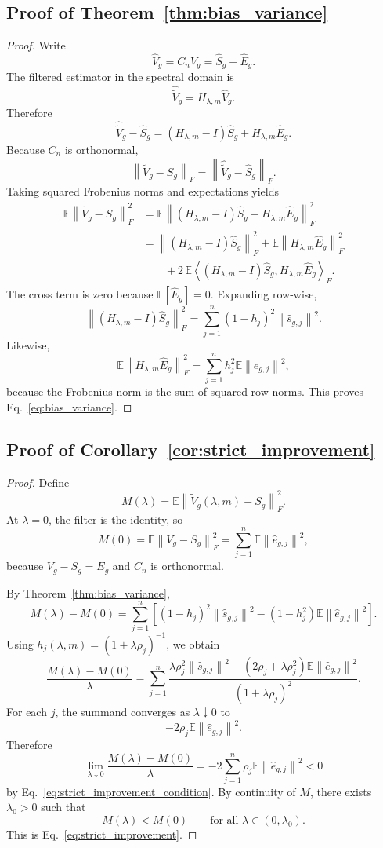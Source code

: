 \documentclass{article}
\newcommand{\EE}{\mathbb{E}}
\newcommand{\norm}[1]{\left\lVert #1 \right\rVert}
\newcommand{\inner}[2]{\left\langle #1, #2 \right\rangle}
\begin{document}
\subsection{Proof of Theorem~\ref{thm:bias_variance}}

\begin{proof}
Write
\[
\widehat V_g = C_n V_g = \widehat S_g + \widehat E_g.
\]
The filtered estimator in the spectral domain is
\[
\widehat{\widetilde V}_g
=
H_{\lambda,m}\widehat V_g.
\]
Therefore
\[
\widehat{\widetilde V}_g - \widehat S_g
=
(H_{\lambda,m}-I)\widehat S_g + H_{\lambda,m}\widehat E_g.
\]
Because \(C_n\) is orthonormal,
\[
\norm{\widetilde V_g - S_g}_F
=
\norm{\widehat{\widetilde V}_g - \widehat S_g}_F.
\]
Taking squared Frobenius norms and expectations yields
\begin{align*}
\EE\norm{\widetilde V_g - S_g}_F^2
&=
\EE\norm{(H_{\lambda,m}-I)\widehat S_g + H_{\lambda,m}\widehat E_g}_F^2 \\
&=
\norm{(H_{\lambda,m}-I)\widehat S_g}_F^2
+
\EE\norm{H_{\lambda,m}\widehat E_g}_F^2 \\
&\qquad
+
2\,\EE\inner{(H_{\lambda,m}-I)\widehat S_g}{H_{\lambda,m}\widehat E_g}_F.
\end{align*}
The cross term is zero because \(\EE[\widehat E_g]=0\). Expanding row-wise,
\[
\norm{(H_{\lambda,m}-I)\widehat S_g}_F^2
=
\sum_{j=1}^{n}
(1-h_j)^2 \norm{\widehat s_{g,j}}^2.
\]
Likewise,
\[
\EE\norm{H_{\lambda,m}\widehat E_g}_F^2
=
\sum_{j=1}^{n} h_j^2 \EE\norm{\widehat e_{g,j}}^2,
\]
because the Frobenius norm is the sum of squared row norms. This proves Eq.~\eqref{eq:bias_variance}.
\end{proof}

\subsection{Proof of Corollary~\ref{cor:strict_improvement}}

\begin{proof}
Define
\[
M(\lambda)
=
\EE \norm{\widetilde V_g(\lambda,m) - S_g}_F^2.
\]
At \(\lambda=0\), the filter is the identity, so
\[
M(0)
=
\EE\norm{V_g - S_g}_F^2
=
\sum_{j=1}^{n}\EE\norm{\widehat e_{g,j}}^2,
\]
because \(V_g-S_g = E_g\) and \(C_n\) is orthonormal.

By Theorem~\ref{thm:bias_variance},
\[
M(\lambda)-M(0)
=
\sum_{j=1}^{n}
\left[
(1-h_j)^2 \norm{\widehat s_{g,j}}^2
-
(1-h_j^2)\EE\norm{\widehat e_{g,j}}^2
\right].
\]
Using \(h_j(\lambda,m)=(1+\lambda \rho_j)^{-1}\), we obtain
\[
\frac{M(\lambda)-M(0)}{\lambda}
=
\sum_{j=1}^{n}
\frac{
\lambda \rho_j^2 \norm{\widehat s_{g,j}}^2
-
(2\rho_j+\lambda \rho_j^2)\EE\norm{\widehat e_{g,j}}^2
}{
(1+\lambda \rho_j)^2
}.
\]
For each \(j\), the summand converges as \(\lambda\downarrow 0\) to
\[
-2\rho_j \EE\norm{\widehat e_{g,j}}^2.
\]
Therefore
\[
\lim_{\lambda\downarrow 0}
\frac{M(\lambda)-M(0)}{\lambda}
=
-2\sum_{j=1}^{n}\rho_j \EE\norm{\widehat e_{g,j}}^2
<
0
\]
by Eq.~\eqref{eq:strict_improvement_condition}. By continuity of \(M\), there exists \(\lambda_0>0\) such that
\[
M(\lambda) < M(0)
\qquad \text{for all } \lambda\in(0,\lambda_0).
\]
This is Eq.~\eqref{eq:strict_improvement}.
\end{proof}
\end{document}
